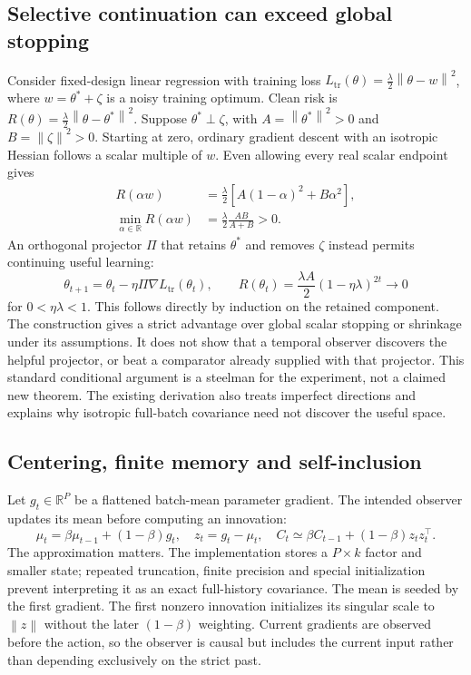 \documentclass[10pt]{article}
\newcommand{\R}{\mathbb{R}}
\newcommand{\norm}[1]{\left\lVert#1\right\rVert}
\begin{document}
\subsection{Selective continuation can exceed global stopping}
Consider fixed-design linear regression with training loss $L_{\mathrm{tr}}(\theta)=\frac{\lambda}{2}\norm{\theta-w}^2$, where $w=\theta^*+\zeta$ is a noisy training optimum. Clean risk is $R(\theta)=\frac{\lambda}{2}\norm{\theta-\theta^*}^2$. Suppose $\theta^*\perp\zeta$, with $A=\norm{\theta^*}^2>0$ and $B=\norm{\zeta}^2>0$. Starting at zero, ordinary gradient descent with an isotropic Hessian follows a scalar multiple of $w$. Even allowing every real scalar endpoint gives
\begin{align}
R(\alpha w)&=\frac{\lambda}{2}\left[A(1-\alpha)^2+B\alpha^2\right],\\
\min_{\alpha\in\R}R(\alpha w)&=\frac{\lambda}{2}\frac{AB}{A+B}>0.
\end{align}
An orthogonal projector $\Pi$ that retains $\theta^*$ and removes $\zeta$ instead permits continuing useful learning:
\begin{equation}
\theta_{t+1}=\theta_t-\eta\Pi\nabla L_{\mathrm{tr}}(\theta_t),\qquad
R(\theta_t)=\frac{\lambda A}{2}(1-\eta\lambda)^{2t}\longrightarrow0
\end{equation}
for $0<\eta\lambda<1$. This follows directly by induction on the retained component. The construction gives a strict advantage over global scalar stopping or shrinkage under its assumptions. It does not show that a temporal observer discovers the helpful projector, or beat a comparator already supplied with that projector. This standard conditional argument is a steelman for the experiment, not a claimed new theorem. The existing derivation also treats imperfect directions and explains why isotropic full-batch covariance need not discover the useful space.

\subsection{Centering, finite memory and self-inclusion}
Let $g_t\in\R^P$ be a flattened batch-mean parameter gradient. The intended observer updates its mean before computing an innovation:
\begin{equation}
\mu_t=\beta\mu_{t-1}+(1-\beta)g_t,\quad
z_t=g_t-\mu_t,\quad
C_t\simeq\beta C_{t-1}+(1-\beta)z_tz_t^\top.
\label{eq:observer}
\end{equation}
The approximation matters. The implementation stores a $P\times k$ factor and smaller state; repeated truncation, finite precision and special initialization prevent interpreting it as an exact full-history covariance. The mean is seeded by the first gradient. The first nonzero innovation initializes its singular scale to $\norm{z}$ without the later $(1-\beta)$ weighting. Current gradients are observed before the action, so the observer is causal but includes the current input rather than depending exclusively on the strict past.
\end{document}

